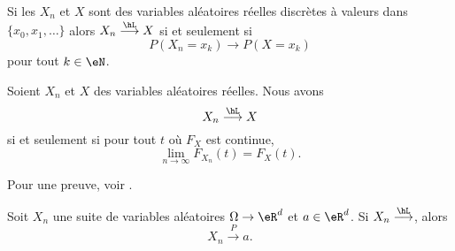 \begin{proposition}
    Si les \( X_n\) et \( X\) sont des variables aléatoires réelles discrètes à valeurs dans \( \{ x_0,x_1,\ldots \}\) alors \( X_n\stackrel{\hL}{\longrightarrow} X\) si et seulement si
    \begin{equation}
        P(X_n=x_k)\to P(X=x_k)
    \end{equation}
    pour tout \( k\in\eN\).
\end{proposition}

\begin{proposition}     \label{PropXncvXFXcvFxt}
    Soient \( X_n\) et \( X\) des variables aléatoires réelles. Nous avons
    \begin{equation}
        X_n\stackrel{\hL}{\longrightarrow}X
    \end{equation}
    si et seulement si pour tout \( t\) où \( F_X\) est continue,
    \begin{equation}
        \lim_{n\to \infty} F_{X_n}(t)=F_X(t).
    \end{equation}
\end{proposition}
Pour une preuve, voir \cite{CourgGudRennes}.

\begin{proposition}     \label{PropCvLfcvPsicst}
    Soit \( X_n\) une suite de variables aléatoires \( \Omega\to \eR^d\) et \( a\in\eR^d\). Si \( X_n\stackrel{\hL}{\longrightarrow}\), alors
    \begin{equation}
        X_n\stackrel{P}{\longrightarrow}a.
    \end{equation}
\end{proposition}

